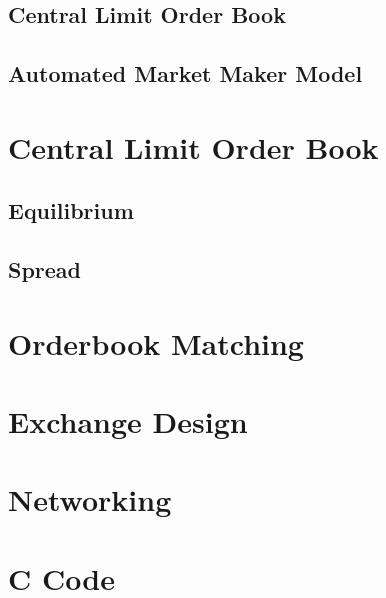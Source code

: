 \documentclass[12pt]{article}
\begin{document}
\subsection{Central Limit Order Book} 

\subsection{Automated Market Maker Model}


\section{Central Limit Order Book}

\subsection{Equilibrium}

\subsection{Spread}

\section{Orderbook Matching}

\section{Exchange Design}

\section{Networking}

\section{C Code}
\end{document}

